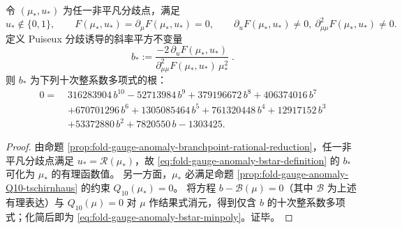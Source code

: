 \begin{proposition}\label{prop:fold-gauge-anomaly-leyang-slope-square-minpoly}
令 \((\mu_\ast,u_\ast)\) 为任一非平凡分歧点，满足
\[
u_\ast\notin\{0,1\},\qquad
F(\mu_\ast,u_\ast)=\partial_\mu F(\mu_\ast,u_\ast)=0,
\qquad
\partial_uF(\mu_\ast,u_\ast)\neq 0,\ \partial_{\mu\mu}^2F(\mu_\ast,u_\ast)\neq 0.
\]
定义 Puiseux 分歧诱导的斜率平方不变量
\begin{equation}\label{eq:fold-gauge-anomaly-bstar-definition}
\boxed{\;
b_\ast:=
\frac{-2\,\partial_u F(\mu_\ast,u_\ast)}{\partial_{\mu\mu}^2F(\mu_\ast,u_\ast)\,\mu_\ast^{2}}\; }.
\end{equation}
则 \(b_\ast\) 为下列十次整系数多项式的根：
\begin{equation}\label{eq:fold-gauge-anomaly-bstar-minpoly}
\boxed{\;
\begin{aligned}
0=\;&316283904\, b^{10}-52713984\, b^{9}+379196672\, b^{8}+406374016\, b^{7}\\
&+670701296\, b^{6}+1305085464\, b^{5}+761320448\, b^{4}+12917152\, b^{3}\\
&+53372880\, b^{2}+7820550\, b-1303425.
\end{aligned}}
\end{equation}
\end{proposition}
\begin{proof}
由命题 \ref{prop:fold-gauge-anomaly-branchpoint-rational-reduction}，任一非平凡分歧点满足 \(u_\ast=\mathcal R(\mu_\ast)\)，故 \eqref{eq:fold-gauge-anomaly-bstar-definition} 的 \(b_\ast\) 可化为 \(\mu_\ast\) 的有理函数值。
另一方面，\(\mu_\ast\) 必满足命题 \ref{prop:fold-gauge-anomaly-Q10-tschirnhaus} 的约束 \(Q_{10}(\mu_\ast)=0\)。
将方程 \(b-\mathcal B(\mu)=0\)（其中 \(\mathcal B\) 为上述有理表达）与 \(Q_{10}(\mu)=0\) 对 \(\mu\) 作结果式消元，得到仅含 \(b\) 的十次整系数多项式；化简后即为 \eqref{eq:fold-gauge-anomaly-bstar-minpoly}。证毕。
\end{proof}

